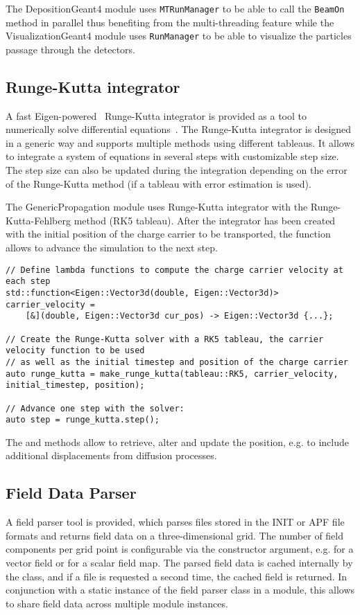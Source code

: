 The DepositionGeant4 module uses \texttt{MTRunManager} to be able to call the \texttt{BeamOn} method in parallel thus benefiting from the multi-threading feature while the VisualizationGeant4 module uses \texttt{RunManager} to be able to visualize the particles passage through the detectors.

\subsection{Runge-Kutta integrator}
A fast Eigen-powered~\cite{eigen3} Runge-Kutta integrator is provided as a tool to numerically solve differential equations~\cite{fehlberg}.
The Runge-Kutta integrator is designed in a generic way and supports multiple methods using different tableaus.
It allows to integrate a system of equations in several steps with customizable step size.
The step size can also be updated during the integration depending on the error of the Runge-Kutta method (if a tableau with error estimation is used).

The GenericPropagation module uses Runge-Kutta integrator with the Runge-Kutta-Fehlberg method (RK5 tableau).
After the integrator has been created with the initial position of the charge carrier to be transported, the  function allows to advance the simulation to the next step.
\begin{verbatim}
// Define lambda functions to compute the charge carrier velocity at each step
std::function<Eigen::Vector3d(double, Eigen::Vector3d)> carrier_velocity =
    [&](double, Eigen::Vector3d cur_pos) -> Eigen::Vector3d {...};

// Create the Runge-Kutta solver with a RK5 tableau, the carrier velocity function to be used
// as well as the initial timestep and position of the charge carrier
auto runge_kutta = make_runge_kutta(tableau::RK5, carrier_velocity, initial_timestep, position);

// Advance one step with the solver:
auto step = runge_kutta.step();
\end{verbatim}

The  and  methods allow to retrieve, alter and update the position, e.g. to include additional displacements from diffusion processes.

\subsection{Field Data Parser}
A field parser tool is provided, which parses files stored in the INIT or APF file formats and returns field data on a three-dimensional grid.
The number of field components per grid point is configurable via the constructor argument, e.g.  for a vector field or  for a scalar field map.
The parsed field data is cached internally by the class, and if a file is requested a second time, the cached field is returned.
In conjunction with a static instance of the field parser class in a module, this allows to share field data across multiple module instances.

